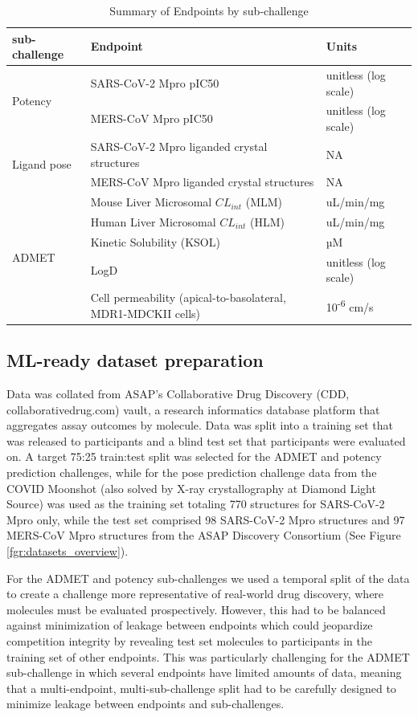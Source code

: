 \documentclass[journal=jcim,manuscript=article]{achemso}
\begin{document}
\begin{table}[ht]
\centering
\caption{Summary of Endpoints by sub-challenge}
\begin{tabular}{|l|l|l|}
\hline
\textbf{sub-challenge} & \textbf{Endpoint} & \textbf{Units} \\
\hline
\multirow{2}{*}{Potency} 
& SARS-CoV-2 Mpro pIC50 & unitless (log scale) \\
& MERS-CoV Mpro pIC50    & unitless (log scale) \\
\hline
\multirow{2}{*}{Ligand pose} 
& SARS-CoV-2 Mpro liganded crystal structures & NA \\
& MERS-CoV Mpro liganded crystal structures   & NA \\
\hline
\multirow{5}{*}{ADMET} 
& Mouse Liver Microsomal $CL_{int}$ (MLM)  & uL/min/mg \\
& Human Liver Microsomal $CL_{int}$ (HLM)  & uL/min/mg \\
& Kinetic Solubility (KSOL)               & µM \\
& LogD                                    & unitless (log scale) \\
& Cell permeability (apical-to-basolateral, MDR1-MDCKII cells) & 10\textsuperscript{-6} cm/s \\
\hline
\end{tabular}
\end{table}

\subsection{ML-ready dataset preparation}

Data was collated from ASAP’s Collaborative Drug Discovery (CDD, collaborativedrug.com) vault, a research informatics database platform that aggregates assay outcomes by molecule. Data was split into a training set that was released to participants and a blind test set that participants were evaluated on. A target 75:25 train:test split was selected for the ADMET and potency prediction challenges, while for the pose prediction challenge data from the COVID Moonshot\cite{boby_2023} (also solved by X-ray crystallography at Diamond Light Source) was used as the training set totaling 770 structures for SARS-CoV-2 Mpro only, while the test set comprised 98 SARS-CoV-2 Mpro structures and 97 MERS-CoV Mpro structures from the ASAP Discovery Consortium (See Figure \ref{fgr:datasets_overview}).  

For the ADMET and potency sub-challenges we used a temporal split of the data to create a challenge more representative of real-world drug discovery, where molecules must be evaluated prospectively\cite{sheridan_time-split_2013}. However, this had to be balanced against minimization of leakage between endpoints which could jeopardize competition integrity by revealing test set molecules to participants in the training set of other endpoints. This was particularly challenging for the ADMET sub-challenge in which several endpoints have limited amounts of data, meaning that a multi-endpoint, multi-sub-challenge split had to be carefully designed to minimize leakage between endpoints and sub-challenges. 
\end{document}
